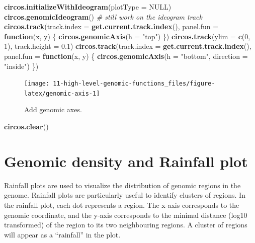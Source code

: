 \documentclass[]{book}
\newenvironment{Shaded}{\begin{snugshade}}{\end{snugshade}}
\newcommand{\KeywordTok}[1]{\textcolor[rgb]{0.13,0.29,0.53}{\textbf{#1}}}
\newcommand{\DataTypeTok}[1]{\textcolor[rgb]{0.13,0.29,0.53}{#1}}
\newcommand{\DecValTok}[1]{\textcolor[rgb]{0.00,0.00,0.81}{#1}}
\newcommand{\FloatTok}[1]{\textcolor[rgb]{0.00,0.00,0.81}{#1}}
\newcommand{\StringTok}[1]{\textcolor[rgb]{0.31,0.60,0.02}{#1}}
\newcommand{\CommentTok}[1]{\textcolor[rgb]{0.56,0.35,0.01}{\textit{#1}}}
\newcommand{\OtherTok}[1]{\textcolor[rgb]{0.56,0.35,0.01}{#1}}
\newcommand{\ControlFlowTok}[1]{\textcolor[rgb]{0.13,0.29,0.53}{\textbf{#1}}}
\newcommand{\NormalTok}[1]{#1}
\begin{document}
\begin{Shaded}
\begin{Highlighting}[]
\KeywordTok{circos.initializeWithIdeogram}\NormalTok{(}\DataTypeTok{plotType =} \OtherTok{NULL}\NormalTok{)}
\KeywordTok{circos.genomicIdeogram}\NormalTok{()}
\CommentTok{# still work on the ideogram track}
\KeywordTok{circos.track}\NormalTok{(}\DataTypeTok{track.index =} \KeywordTok{get.current.track.index}\NormalTok{(), }\DataTypeTok{panel.fun =} \ControlFlowTok{function}\NormalTok{(x, y) \{}
    \KeywordTok{circos.genomicAxis}\NormalTok{(}\DataTypeTok{h =} \StringTok{"top"}\NormalTok{)}
\NormalTok{\})}
\KeywordTok{circos.track}\NormalTok{(}\DataTypeTok{ylim =} \KeywordTok{c}\NormalTok{(}\DecValTok{0}\NormalTok{, }\DecValTok{1}\NormalTok{), }\DataTypeTok{track.height =} \FloatTok{0.1}\NormalTok{)}
\KeywordTok{circos.track}\NormalTok{(}\DataTypeTok{track.index =} \KeywordTok{get.current.track.index}\NormalTok{(), }\DataTypeTok{panel.fun =} \ControlFlowTok{function}\NormalTok{(x, y) \{}
    \KeywordTok{circos.genomicAxis}\NormalTok{(}\DataTypeTok{h =} \StringTok{"bottom"}\NormalTok{, }\DataTypeTok{direction =} \StringTok{"inside"}\NormalTok{)}
\NormalTok{\})}
\end{Highlighting}
\end{Shaded}

\begin{figure}

{\centering \texttt{[image: 11-high-level-genomic-functions\_files/figure-latex/genomic-axis-1]} 

}

\caption{Add genomic axes.}\label{fig:genomic-axis}
\end{figure}

\begin{Shaded}
\begin{Highlighting}[]
\KeywordTok{circos.clear}\NormalTok{()}
\end{Highlighting}
\end{Shaded}

\section{Genomic density and Rainfall
plot}\label{genomic-density-and-rainfall-plot}

Rainfall plots are used to visualize the distribution of genomic regions
in the genome. Rainfall plots are particularly useful to identify
clusters of regions. In the rainfall plot, each dot represents a region.
The x-axis corresponds to the genomic coordinate, and the y-axis
corresponds to the minimal distance (log10 transformed) of the region to
its two neighbouring regions. A cluster of regions will appear as a
``rainfall'' in the plot.
\end{document}
